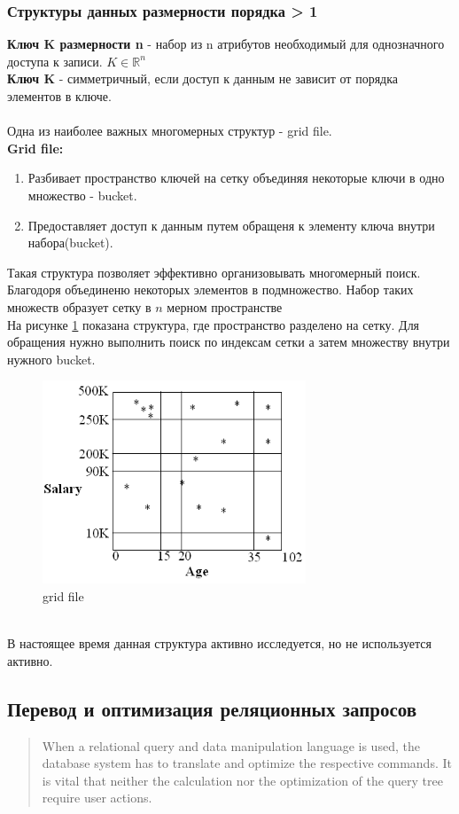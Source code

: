 \documentclass{article}
\begin{document}
\subsubsection{Структуры данных размерности порядка > 1}
\textbf{Ключ K размерности n} - набор из n атрибутов необходимый для однозначного доступа к записи. $K \in \mathbb{R}^n$\\
\textbf{Ключ K} - симметричный, если доступ к данным не зависит от порядка элементов в ключе.\\\\
Одна из наиболее важных многомерных структур - grid file.\\
\textbf{Grid file:}
\begin{enumerate}
    \item Разбивает пространство ключей на сетку объединяя некоторые ключи в одно множество - bucket.
    \item Предоставляет доступ к данным путем обращеня к элементу ключа внутри набора(bucket).
\end{enumerate}
Такая структура позволяет эффективно организовывать многомерный поиск. Благодоря объединеню некоторых элементов в подмножество. Набор таких множеств образует сетку в $n$ мерном пространстве\\
На рисунке \ref{img4} показана структура, где пространство разделено на сетку. Для обращения нужно выполнить поиск по индексам сетки а затем множеству внутри нужного bucket.
\begin{figure}[ht]
    \centering
    \includegraphics[width=0.7\textwidth]{images/grid.png}
    \caption{grid file}
    \label{img4}
\end{figure}
\\
В настоящее время данная структура активно исследуется, но не используется активно.


\subsection{Перевод и оптимизация реляционных запросов}
\begin{quote}
    When a relational query and data manipulation language 
is used, the database system has to translate and optimize the respective commands. It is 
vital that neither the calculation nor the optimization of the query tree require user actions.
\end{quote}
\end{document}
